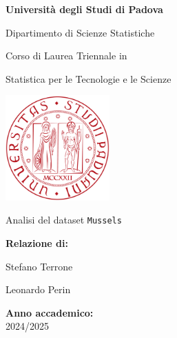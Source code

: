 \documentclass{article} %
\begin{document}


\begin{titlepage}
    \centering
    \vspace{1.5cm}
    {\huge \textbf{Università degli Studi di Padova} \par}
    {\LARGE Dipartimento di Scienze Statistiche \par}
    \vspace{0.5cm}

    {\Large Corso di Laurea Triennale in \par}
    {\Large Statistica per le Tecnologie e le Scienze \par}
    \vspace{1.5cm}

    \includegraphics[width=0.3\textwidth]{immagini/unipd.png} %
    \vspace{1.3cm}

    {\Huge Analisi del dataset \texttt{Mussels} \par}

    \vspace{3cm}
    \begin{flushright}
        {\Large \textbf{Relazione di:} \par}
        {\Large Stefano Terrone \par}
        {\Large Leonardo Perin \par}
        \vspace{2cm}
    \end{flushright}
        {\Large \textbf{Anno accademico:} \\2024/2025 \par}

\end{titlepage}
\end{document}

